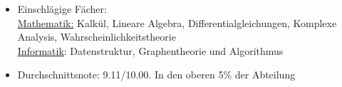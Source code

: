 \begin{itemize}
\item Einschl\"agige F\"acher: \\
	\underline{Mathematik:} Kalk\"ul, Lineare Algebra, Differentialgleichungen, Komplexe Analysis, Wahrscheinlichkeitstheorie\\
	\underline{Informatik}: Datenstruktur, Graphentheorie und Algorithmus \\
\item Durchschnittsnote: 9.11/10.00. In den oberen 5\% der Abteilung
\end{itemize}
